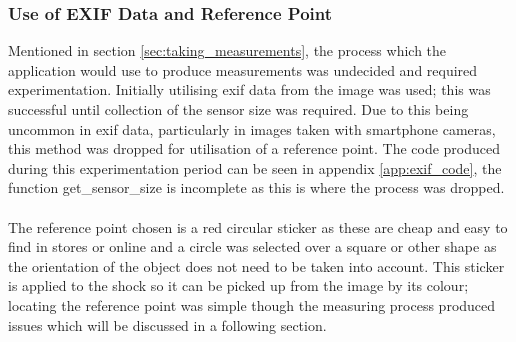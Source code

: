 	\subsubsection{Use of EXIF Data and Reference Point}
		Mentioned in section \ref{sec:taking_measurements}, the process which the application would use to produce measurements was undecided and required experimentation. Initially utilising \gls{exif} data from the image was used; this was successful until collection of the sensor size was required. Due to this being uncommon in \gls{exif} data, particularly in images taken with smartphone cameras, this method was dropped for utilisation of a reference point. The code produced during this experimentation period can be seen in appendix \ref{app:exif_code}, the function {\ttfamily get\_sensor\_size} is incomplete as this is where the process was dropped.
		\\\\
		The reference point chosen is a red circular sticker as these are cheap and easy to find in stores or online and a circle was selected over a square or other shape as the orientation of the object does not need to be taken into account. This sticker is applied to the shock so it can be picked up from the image by its colour; locating the reference point was simple though the measuring process produced issues which will be discussed in a following section.

